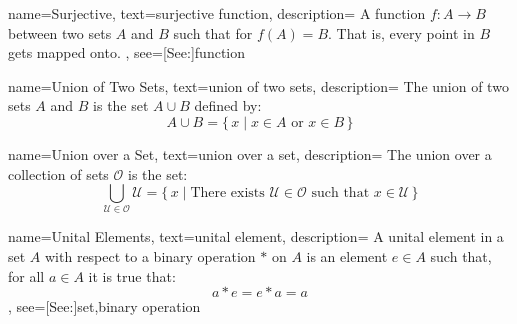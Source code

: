 {
    name={Surjective},
    text={surjective function},
    description={
        A function $f:A\rightarrow{B}$ between two sets $A$ and $B$ such that
        for $f(A)=B$. That is, every point in $B$ gets mapped onto.
    },
    see=[See:]{function}
}

{
    name={Union of Two Sets},
    text={union of two sets},
    description={
            The union of two sets $A$ and $B$ is the set $A\cup{B}$
            defined by:
            \begin{equation*}
                A\cup{B}=\big\{\,x\;|\;x\in{A}\textrm{ or }x\in{B}\,\big\}
            \end{equation*}
    }
}

{
    name={Union over a Set},
    text={union over a set},
    description={
        The union over a collection of sets $\mathcal{O}$ is the set:
        \begin{equation*}
            \bigcup_{\mathcal{U}\in\mathcal{O}}\mathcal{U}
            =\big\{\,x\;|\;\textrm{There exists }\mathcal{U}\in\mathcal{O}
                \textrm{ such that }x\in\mathcal{U}\,\big\}
        \end{equation*}
    }
}

{
    name={Unital Elements},
    text={unital element},
    description={
        A unital element in a set $A$ with respect to a binary operation
        $*$ on $A$ is an element $e\in{A}$ such that, for all $a\in{A}$
        it is true that:
        \begin{equation*}
            a*e=e*a=a
        \end{equation*}
    },
    see=[See:]{set,binary operation}
}




